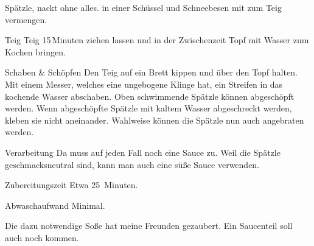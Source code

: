 \begin{recipe}{Spätzle, nackt ohne alles.}
 in einer Schüssel und Schneebesen mit
 zum Teig vermengen.
\item[Teig] Teig 15\,Minuten ziehen lassen und in der Zwischenzeit Topf mit Wasser zum Kochen bringen. 
\item[Schaben \& Schöpfen] Den Teig auf ein Brett kippen und über den Topf halten. Mit einem Messer, welches eine ungebogene Klinge hat, ein Streifen in das kochende Wasser abschaben. Oben schwimmende Spätzle können abgeschöpft werden. 
\hint Wenn abgeschöpfte Spätzle mit kaltem Wasser abgeschreckt werden, kleben sie nicht aneinander.
\hint Wahlweise können die Spätzle nun auch angebraten werden.
\item[Verarbeitung] Da muss auf jeden Fall noch eine Sauce zu. Weil die Spätzle geschmacksneutral sind, kann man auch eine süße Sauce verwenden.
\item[Zubereitungszeit] Etwa 25~Minuten.
\item[Abwaschaufwand] Minimal.
\item Die dazu notwendige Soße hat meine Freunden gezaubert. Ein Saucenteil soll auch noch kommen.
\end{recipe}
